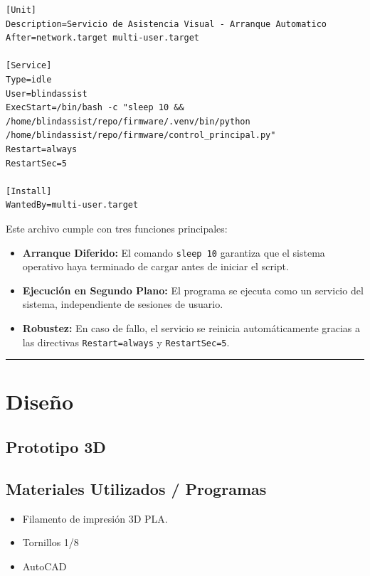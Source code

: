 \documentclass[12pt,a4paper]{article}
\newcommand{\separador}{\vspace{0.5cm}\noindent\rule{\linewidth}{0.5pt}\vspace{0.5cm}}
\begin{document}
\begin{verbatim}
[Unit]
Description=Servicio de Asistencia Visual - Arranque Automatico
After=network.target multi-user.target

[Service]
Type=idle
User=blindassist
ExecStart=/bin/bash -c "sleep 10 && 
/home/blindassist/repo/firmware/.venv/bin/python 
/home/blindassist/repo/firmware/control_principal.py"
Restart=always
RestartSec=5

[Install]
WantedBy=multi-user.target
\end{verbatim}

Este archivo cumple con tres funciones principales:
\begin{itemize}
    \item \textbf{Arranque Diferido:} El comando \texttt{sleep 10} garantiza que el sistema operativo haya terminado de cargar antes de iniciar el script.
    \item \textbf{Ejecución en Segundo Plano:} El programa se ejecuta como un servicio del sistema, independiente de sesiones de usuario.
    \item \textbf{Robustez:} En caso de fallo, el servicio se reinicia automáticamente gracias a las directivas \texttt{Restart=always} y \texttt{RestartSec=5}.
\end{itemize}

\separador

\section{Diseño}

\subsection*{ Prototipo 3D}

\subsection*{ Materiales Utilizados / Programas}
\begin{itemize}
\item Filamento de impresión 3D PLA.
\item Tornillos 1/8
\item AutoCAD
\end{itemize}
\end{document}
